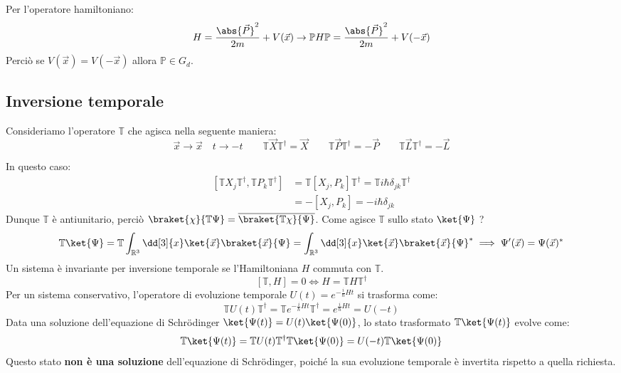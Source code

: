 Per l'operatore hamiltoniano:
\[
    H = \frac{\abs{\vec{P}}^2}{2m} + V(\vec{x}) \to \mathbb{P}H\mathbb{P}= \frac{\abs{\vec{P}}^2}{2m} + V(-\vec{x}) 
\]
Perciò se \(V(\vec{x})= V(-\vec{x})\) allora \(\mathbb{P} \in G_d\).




\subsection{Inversione temporale}

Consideriamo l'operatore \(\mathbb{T}\) che agisca nella seguente maniera:
\[
    \vec{x}\to \vec{x} \quad t \to -t \qquad \mathbb{T}\vec{X}\mathbb{T}^\dagger = \vec{X} \qquad  \mathbb{T}\vec{P}\mathbb{T}^\dagger = - \vec{P} \qquad  \mathbb{T}\vec{L}\mathbb{T}^\dagger = - \vec{L}
\]

In questo caso:
\begin{align*}
    \left[ \mathbb{T}X_j\mathbb{T}^\dagger,\mathbb{T}P_k\mathbb{T}^\dagger \right] 
    &= \mathbb{T}\left[ X_j, P_k \right]\mathbb{T}^\dagger = \mathbb{T}i \hbar \delta_{jk}\mathbb{T}^\dagger \\
    &= - \left[ X_j, P_k \right] = -i\hbar \delta_{jk}
\end{align*}
Dunque \(\mathbb{T}\) è antiunitario, perciò \(\braket{\chi}{\mathbb{T}\Psi}= \overline{\braket{\mathbb{T}\chi}{\Psi}}\).
Come agisce \(\mathbb{T}\) sullo stato \(\ket{\Psi}\) ?
\[
    \mathbb{T}\ket{\Psi}= \mathbb{T}\int_{\mathbb{R}^3}\dd[3]{x}\ket{\vec{x}}\braket{\vec{x}}{\Psi} = \int_{\mathbb{R}^3}\dd[3]{x}\ket{\vec{x}}\braket{\vec{x}}{\Psi}^*
    \implies \Psi'(\vec{x})= \Psi(\vec{x})^*
\]
Un sistema è invariante per inversione temporale se l'Hamiltoniana \(H\) commuta con \(\mathbb{T}\).
\[
    [\mathbb{T}, H] = 0 \iff H = \mathbb{T} H \mathbb{T}^\dagger
\]
Per un sistema conservativo, l'operatore di evoluzione temporale \(U(t) = e^{-\frac{i}{\hbar}Ht}\) si trasforma come:
\begin{equation}
    \mathbb{T} U(t) \mathbb{T}^\dagger = \mathbb{T} e^{-\frac{i}{\hbar}Ht} \mathbb{T}^\dagger = e^{\frac{i}{\hbar}Ht} = U(-t)
\end{equation}
Data una soluzione dell'equazione di Schrödinger \(\ket{\Psi(t)} = U(t)\ket{\Psi(0)}\), lo stato trasformato \(\mathbb{T}\ket{\Psi(t)}\) evolve come:
\[
    \mathbb{T}\ket{\Psi(t)} = \mathbb{T} U(t) \mathbb{T}^\dagger \mathbb{T}\ket{\Psi(0)} = U(-t) \mathbb{T}\ket{\Psi(0)}
\]
Questo stato \textbf{non è una soluzione} dell'equazione di Schrödinger, poiché la sua evoluzione temporale è invertita rispetto a quella richiesta.

